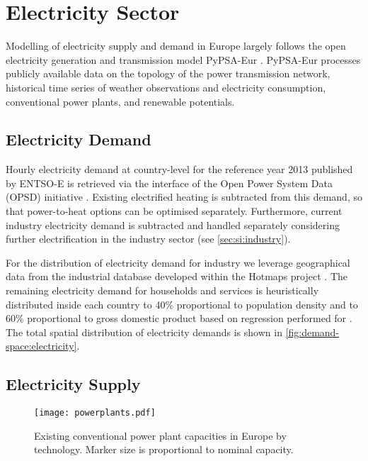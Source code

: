 \section{Electricity Sector}
\label{sec:si:electricity}

Modelling of electricity supply and demand in Europe largely follows the open
electricity generation and transmission model PyPSA-Eur
. PyPSA-Eur processes publicly available data on
the topology of the power transmission network, historical time series of
weather observations and electricity consumption, conventional power plants, and
renewable potentials.

\subsection{Electricity Demand}
\label{sec:si:electricity:demand}

Hourly electricity demand at country-level for the reference year 2013 published
by ENTSO-E is retrieved via the interface of the Open Power System Data (OPSD)
initiative . Existing electrified heating is subtracted from this
demand, so that power-to-heat options can be optimised separately. Furthermore,
current industry electricity demand is subtracted and handled separately
considering further electrification in the industry sector (see \cref{sec:si:industry}).

For the distribution of electricity demand for industry we leverage geographical
data from the industrial database developed within the Hotmaps project .
The remaining electricity demand for households and services is heuristically
distributed inside each country to 40\% proportional to population density and
to 60\% proportional to gross domestic product based on regression performed for
. The total spatial distribution of electricity
demands is shown in \cref{fig:demand-space:electricity}.

\subsection{Electricity Supply}

\begin{SCfigure}
    \caption{Existing conventional power plant capacities in Europe by technology. Marker size is proportional to nominal capacity.}
    \label{fig:powerplants}
    \texttt{[image: powerplants.pdf]}
\end{SCfigure}

